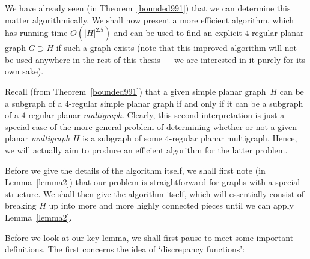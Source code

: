 \documentclass{article}
\newtheorem{Proof of Theorem}{Proof of Theorem}
\begin{document}
We have already seen (in Theorem~\ref{bounded991}) that we can determine this matter algorithmically.
We shall now present a more efficient algorithm,
which has running time $O \left( |H|^{2.5} \right)$
and can be used to find an explicit $4$-regular planar graph $G \supset H$ if such a graph exists
(note that this improved algorithm will not be used anywhere in the rest of this thesis ---
we are interested in it purely for its own sake).

Recall (from Theorem~\ref{bounded991})
that a given simple planar graph~$H$ can be a subgraph of a $4$-regular simple planar graph if and only if
it can be a subgraph of a $4$-regular planar \textit{multigraph}.
Clearly, this second interpretation is just a special case of the more general problem of
determining whether or not a given planar \textit{multigraph} $H$ is a subgraph of some $4$-regular planar multigraph.
Hence, we will actually aim to produce an efficient algorithm for the latter problem.

Before we give the details of the algorithm itself,
we shall first note (in Lemma~\ref{lemma2})
that our problem is straightforward for graphs with a special structure.
We shall then give the algorithm itself,
which will essentially consist of breaking $H$ up
into more and more highly connected pieces until we can apply Lemma~\ref{lemma2}. 





\begin{figure}[omitted: a diagram of this paper's results, not reproduced here]\end{figure}















Before we look at our key lemma,
we shall first pause to meet some important definitions.
The first concerns the idea of `discrepancy functions':
\end{document}
